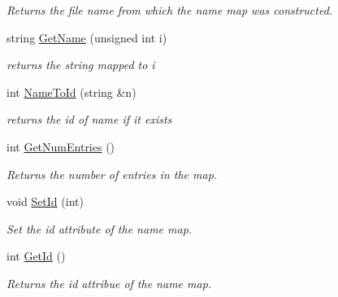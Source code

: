 \begin{DoxyCompactItemize}
\begin{DoxyCompactList}\small\item\em Returns the file name from which the name map was constructed. \item\end{DoxyCompactList}\item 
\hypertarget{class_name_map_a0ceabf530c3093d6fa163932c928d7bf}{
string \hyperlink{class_name_map_a0ceabf530c3093d6fa163932c928d7bf}{GetName} (unsigned int i)}
\label{class_name_map_a0ceabf530c3093d6fa163932c928d7bf}

\begin{DoxyCompactList}\small\item\em returns the string mapped to i \item\end{DoxyCompactList}\item 
\hypertarget{class_name_map_ac54de62673f869844ec7079665ee1415}{
int \hyperlink{class_name_map_ac54de62673f869844ec7079665ee1415}{NameToId} (string \&n)}
\label{class_name_map_ac54de62673f869844ec7079665ee1415}

\begin{DoxyCompactList}\small\item\em returns the id of name if it exists \item\end{DoxyCompactList}\item 
\hypertarget{class_name_map_ab1922430c9e4d12e67b5f27edf9afd15}{
int \hyperlink{class_name_map_ab1922430c9e4d12e67b5f27edf9afd15}{GetNumEntries} ()}
\label{class_name_map_ab1922430c9e4d12e67b5f27edf9afd15}

\begin{DoxyCompactList}\small\item\em Returns the number of entries in the map. \item\end{DoxyCompactList}\item 
\hypertarget{class_name_map_a61afb305b470bab4e3c9e14279d6f1c5}{
void \hyperlink{class_name_map_a61afb305b470bab4e3c9e14279d6f1c5}{SetId} (int)}
\label{class_name_map_a61afb305b470bab4e3c9e14279d6f1c5}

\begin{DoxyCompactList}\small\item\em Set the id attribute of the name map. \item\end{DoxyCompactList}\item 
\hypertarget{class_name_map_a5ec2b743e894000de9dcc0c7cf198775}{
int \hyperlink{class_name_map_a5ec2b743e894000de9dcc0c7cf198775}{GetId} ()}
\label{class_name_map_a5ec2b743e894000de9dcc0c7cf198775}

\begin{DoxyCompactList}\small\item\em Returns the id attribue of the name map. \item\end{DoxyCompactList}\end{DoxyCompactItemize}
